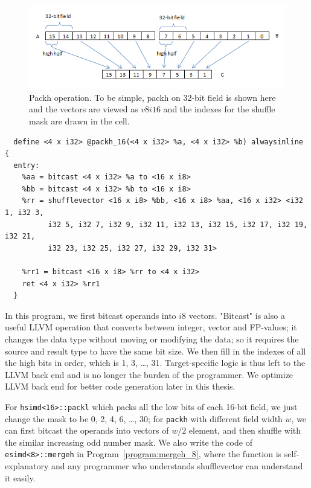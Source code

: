 \begin{figure}[ht!]
\centering
\includegraphics[width=130mm]{draw/packh_16.png}
\caption[Packh on 32-bit field width vectors.]{Packh operation. To be simple, packh on 32-bit field is shown here and the vectors are viewed as $v8i16$ and the indexes for the shuffle mask are drawn in the cell.}
\label{figure:packh_16}
\end{figure}

\begin{program}
\begin{verbatim}
  define <4 x i32> @packh_16(<4 x i32> %a, <4 x i32> %b) alwaysinline {
  entry:
    %aa = bitcast <4 x i32> %a to <16 x i8>
    %bb = bitcast <4 x i32> %b to <16 x i8>
    %rr = shufflevector <16 x i8> %bb, <16 x i8> %aa, <16 x i32> <i32 1, i32 3,
          i32 5, i32 7, i32 9, i32 11, i32 13, i32 15, i32 17, i32 19, i32 21,
          i32 23, i32 25, i32 27, i32 29, i32 31>

    %rr1 = bitcast <16 x i8> %rr to <4 x i32>
    ret <4 x i32> %rr1
  }
\end{verbatim}
\caption[Shufflevector implementation of packh.]{Shufflevector implementation of packh, it is machine independent. {\tt <4 x i32>} is a general vector type we use for all SIMD registers to simplify function interface.}
\label{program:packh_16}
\end{program}

In this program, we first bitcast operands into $i8$ vectors. "Bitcast" is also a useful LLVM operation that converts between integer, vector and FP-values; it changes the data type without moving or modifying the data; so it requires the source and result type to have the same bit size. We then fill in the indexes of all the high bits in order, which is 1, 3, \ldots, 31. Target-specific logic is thus left to the LLVM back end and is no longer the burden of the programmer. We optimize LLVM back end for better code generation later in this thesis.

For \verb|hsimd<16>::packl| which packs all the low bits of each 16-bit field, we just change the mask to be 0, 2, 4, 6, \ldots, 30; for {\tt packh} with different field width $w$, we can first bitcast the operands into vectors of $w/2$ element, and then shuffle with the similar increasing odd number mask. We also write the code of \verb|esimd<8>::mergeh| in Program~\ref{program:mergeh_8}, where the function is self-explanatory and any programmer who understands shufflevector can understand it easily.

